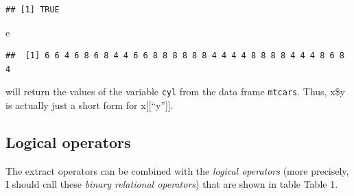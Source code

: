 \documentclass[
  12pt,
  oneside]{book}
\newenvironment{Shaded}{\begin{snugshade}}{\end{snugshade}}
\newcommand{\NormalTok}[1]{#1}
\theoremstyle{definition}
\theoremstyle{definition}
\theoremstyle{definition}
\theoremstyle{definition}
\theoremstyle{remark}
\begin{document}
\begin{verbatim}
## [1] TRUE
\end{verbatim}

\begin{Shaded}
\begin{Highlighting}[]
\NormalTok{e}
\end{Highlighting}
\end{Shaded}

\begin{verbatim}
##  [1] 6 6 4 6 8 6 8 4 4 6 6 8 8 8 8 8 8 4 4 4 4 8 8 8 8 4 4 4 8 6 8 4
\end{verbatim}

will return the values of the variable \texttt{cyl} from the data frame \texttt{mtcars}.
Thus, x\$y is actually just a short form for x{[}{[}``y''{]}{]}.

\hypertarget{logical-operators}{%
\subsection{Logical operators}\label{logical-operators}}

The extract operators can be combined with the \emph{logical operators} (more precisely, I should call these \emph{binary relational operators}) that are shown in table Table 1.
\end{document}
